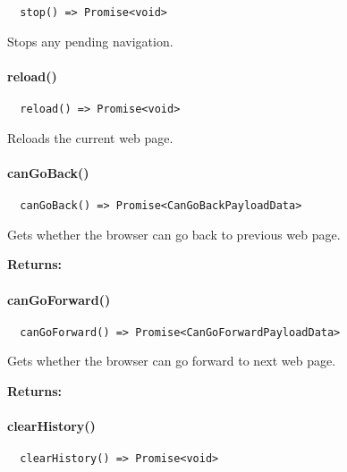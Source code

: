 \begin{verbatim}
  stop() => Promise<void>
\end{verbatim}

Stops any pending navigation.



\paragraph{reload()}

\begin{verbatim}
  reload() => Promise<void>
\end{verbatim}

Reloads the current web page.



\paragraph{canGoBack()}

\begin{verbatim}
  canGoBack() => Promise<CanGoBackPayloadData>
\end{verbatim}

Gets whether the browser can go back to previous web page.

\textbf{Returns:} 



\paragraph{canGoForward()}

\begin{verbatim}
  canGoForward() => Promise<CanGoForwardPayloadData>
\end{verbatim}

Gets whether the browser can go forward to next web page.

\textbf{Returns:} 


\newpage

\paragraph{clearHistory()}

\begin{verbatim}
  clearHistory() => Promise<void>
\end{verbatim}

